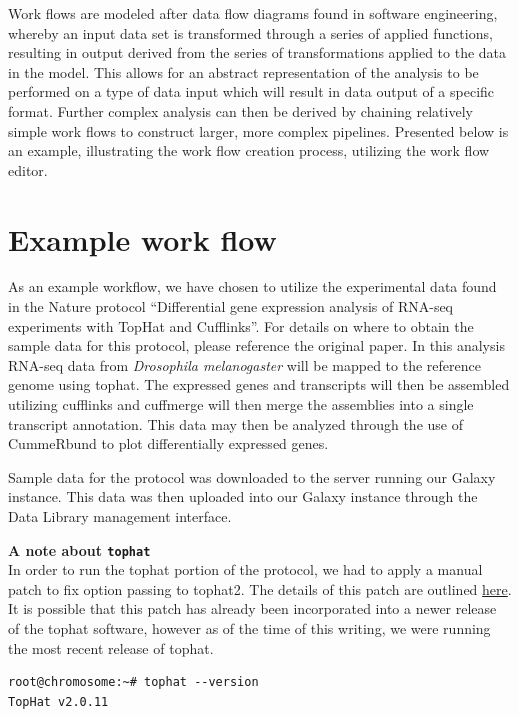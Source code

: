 \documentclass[a4paper,10pt]{article}
\begin{document}
Work flows are modeled after data flow diagrams found in software engineering, whereby an input data set is transformed through a series of applied functions, resulting in output derived from the series of transformations applied to the data in the model.  This allows for an abstract representation of the analysis to be performed on a type of data input which will result in data output of a specific format.  Further complex analysis can then be derived by chaining relatively simple work flows to construct larger, more complex pipelines.  Presented below is an example, illustrating the work flow creation process, utilizing the work flow editor.

\section{Example work flow}
As an example workflow, we have chosen to utilize the experimental data found in the Nature protocol ``Differential gene expression analysis of RNA-seq experiments with TopHat and Cufflinks''.  For details on where to obtain the sample data for this protocol, please reference the original paper.  In this analysis RNA-seq data from \textit{Drosophila melanogaster} will be mapped to the reference genome using tophat.  The expressed genes and transcripts will then be assembled utilizing cufflinks and cuffmerge will then merge the assemblies into a single transcript annotation.  This data may then be analyzed through the use of CummeRbund to plot differentially expressed genes.

Sample data for the protocol was downloaded to the server running our Galaxy instance.  This data was then uploaded into our Galaxy instance through the Data Library management interface.\vspace{1em}\\
\setlength{\fboxsep}{0.5em}
\newsavebox\lstbox
\begin{lrbox}{\lstbox}
\begin{minipage}[c][][c]{.98\textwidth}
\textbf{A note about \texttt{\footnotesize{tophat}}}\\
In order to run the tophat portion of the protocol, we had to apply a manual patch to fix option passing to tophat2.  The details of this patch are outlined \href{https://groups.google.com/forum/#!topic/tuxedo-tools-users/vG5Rn0IgxoA}{here}.  It is possible that this patch has already been incorporated into a newer release of the tophat software, however as of the time of this writing, we were running the most recent release of tophat.
\begin{lstlisting}[xleftmargin=2em,xrightmargin=2em,linewidth=\textwidth]
root@chromosome:~# tophat --version
TopHat v2.0.11
\end{lstlisting}
\end{minipage}
\end{lrbox}
\end{document}
